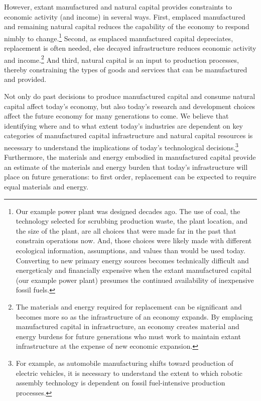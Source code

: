 However, extant manufactured and natural capital
provides constraints to economic activity (and income) in several ways. 
First, emplaced manufactured and remaining natural capital 
reduces the capability of the economy to respond nimbly to change.\footnote{Our 
	example power plant was designed decades ago. 
	The use of coal, 
	the technology selected for scrubbing production waste, 
	the plant location, 
	and the size of the plant, are all choices that were made far in the past 
	that constrain operations now.
	And, those choices were likely made with different ecological information,
	assumptions, and values than would be used today.
	Converting to new primary energy sources
	becomes technically difficult and energeticaly and financially expensive 
	when the extant manufactured capital (our example power plant) 
	presumes the continued availability of inexpensive fossil fuels.
	}
Second, as emplaced manufactured capital depreciates, 
replacement is often needed,
else decayed infrastructure reduces economic activity and income.\footnote{The
	materials and energy required for replacement can be significant
	and becomes more so as the infrastructure of an economy expands.
	By emplacing manufactured capital in infrastructure, 
	an economy creates material and energy burdens for future generations 
	who must work to maintain extant infrastructure at the expense of 
	new economic expansion.
	}
And third, natural capital is an input to production processes, 
thereby constraining the types of goods and services 
that can be manufactured and provided. 

Not only do past decisions to produce manufactured capital and consume natural capital 
affect today's economy, 
but also today's research and development choices
affect the future economy for many generations to come.
We believe that identifying where and to what extent today's industries are dependent on 
key categories of manufactured capital infrastructure and natural capital resources
is necessary to understand the
implications of today's technological decisions.\footnote{For
	example, as automobile manufacturing shifts toward 
	production of electric vehicles,
	it is necessary to understand the extent to which robotic assembly technology
	is dependent on fossil fuel-intensive production processes.
	}
Furthermore, the materials and energy embodied in manufactured capital
provide an estimate of the materials and energy burden that today's infrastructure 
will place on future generations:
to first order, replacement can be expected to require equal materials and energy.

